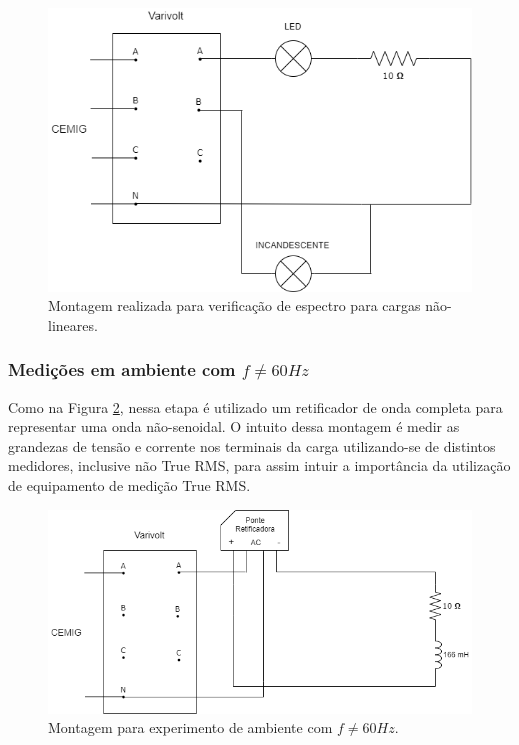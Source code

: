 \documentclass[a4paper,12pt,oneside,openany,table,xcdraw]{article}
\begin{document}
\vspace{1.5cm}
\begin{figure}[H]
\centering
\includegraphics[width=13cm]{m1-circuito}
\caption{Montagem realizada para verificação de espectro para cargas não-lineares.}
\label{m1:esquema}
\end{figure}

\newpage
\subsubsection{Medições em ambiente com $f\ne 60Hz$}
Como na Figura \ref{m2:esquema}, nessa etapa é utilizado um retificador de onda completa para representar uma onda não-senoidal. O intuito dessa montagem é medir as grandezas de tensão e corrente nos terminais da carga utilizando-se de distintos medidores, inclusive não True RMS, para assim intuir a importância da utilização de equipamento de medição True RMS.

\vspace{1.5cm}
\begin{figure}[H]
\centering
\includegraphics[width=13.3cm]{m2-circuito}
\caption{Montagem para experimento de ambiente com $f\ne 60Hz$.}
\label{m2:esquema}
\end{figure}
\vspace{0.1cm}
\end{document}
